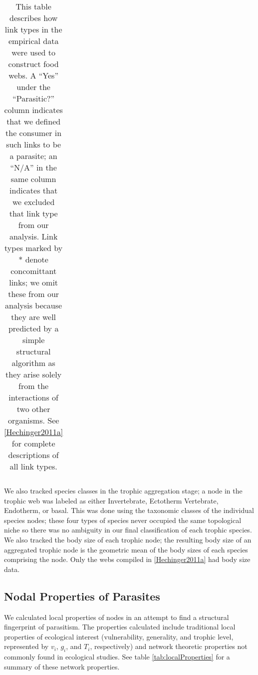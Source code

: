 \documentclass[../dissertation.tex]{subfiles}
\begin{document}
\begin{table}
\begin{tabular}{r l l}
        \bottomrule
    \end{tabular}
    \caption{This table describes how link types in the empirical data
        were used to construct food webs. A ``Yes'' under the ``Parasitic?''
        column indicates that we defined the consumer in such links to be a
        parasite; an ``N/A'' in the same column indicates that we excluded that
        link type from our analysis. Link types marked by * denote concomittant
        links; we omit these from our analysis because they are well predicted
        by a simple structural algorithm as they arise solely from the
        interactions of two other organisms. See \ref{Hechinger2011a} for complete
        descriptions of all link types.
    \label{tab:foodWebLinks}}
\end{table}

We also tracked species classes in the trophic aggregation stage; a node in the
trophic web was labeled as either Invertebrate, Ectotherm Vertebrate,
Endotherm, or basal. This was done using the taxonomic classes of the
individual species nodes; these four types of species never occupied the same
topological niche so there was no ambiguity in our final classification of each
trophic species. We also tracked the body size of each trophic node; the
resulting body size of an aggregated trophic node is the geometric mean of the
body sizes of each species comprising the node. Only the webs compiled in
\ref{Hechinger2011a} had body size data.

\subsection{Nodal Properties of Parasites} We calculated local properties of
nodes in an attempt to find a structural fingerprint of parasitism. The
properties calculated include traditional local properties of ecological
interest (vulnerability, generality, and trophic level, represented by $v_i$,
$g_i$, and $T_i$, respectively) and network theoretic properties not commonly
found in ecological studies. See table \ref{tab:localProperties} for a summary
of these network properties.   
\end{document}
